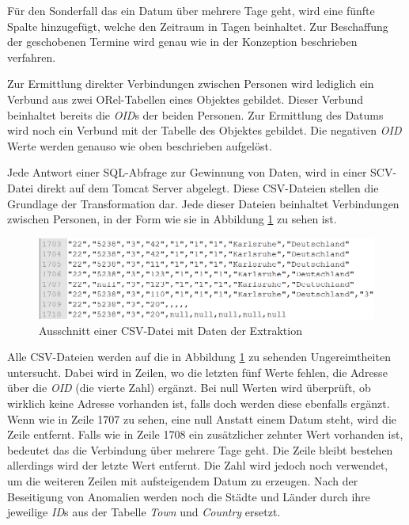 Für den Sonderfall das ein Datum über mehrere Tage geht, wird eine fünfte Spalte hinzugefügt, welche den Zeitraum in Tagen beinhaltet. Zur Beschaffung der geschobenen Termine wird genau wie in der Konzeption beschrieben verfahren.

Zur Ermittlung direkter Verbindungen zwischen Personen wird lediglich ein Verbund aus zwei ORel-Tabellen eines Objektes gebildet. Dieser Verbund beinhaltet bereits die \textit{OID}s der beiden Personen. Zur Ermittlung des Datums wird noch ein Verbund mit der Tabelle des Objektes gebildet. Die negativen \textit{OID} Werte werden genauso wie oben beschrieben aufgelöst. 

Jede Antwort einer SQL-Abfrage zur Gewinnung von Daten, wird in einer SCV-Datei direkt auf dem Tomcat Server abgelegt. Diese CSV-Dateien stellen die Grundlage der Transformation dar. Jede dieser Dateien beinhaltet Verbindungen zwischen Personen, in der Form wie sie in Abbildung \ref{fig:umsetzung_csv_datei} zu sehen ist. 

\begin{figure}[htbp]
\begin{center}
\includegraphics[width=1.0\textwidth]{pics/umsetzung_csv_datei.png}
\caption{Ausschnitt einer CSV-Datei mit Daten der Extraktion}
\label{fig:umsetzung_csv_datei}
\end{center}
\end{figure}

Alle CSV-Dateien werden auf die in Abbildung \ref{fig:umsetzung_csv_datei} zu sehenden Ungereimtheiten untersucht. Dabei wird in Zeilen, wo die letzten fünf Werte fehlen, die Adresse über die \textit{OID} (die vierte Zahl) ergänzt. Bei null Werten wird überprüft, ob wirklich keine Adresse vorhanden ist, falls doch werden diese ebenfalls ergänzt. Wenn wie in Zeile 1707 zu sehen, eine null Anstatt einem Datum steht, wird die Zeile entfernt. Falls wie in Zeile 1708 ein zusätzlicher zehnter Wert vorhanden ist, bedeutet das die Verbindung über mehrere Tage geht. Die Zeile bleibt bestehen allerdings wird der letzte Wert entfernt. Die Zahl wird jedoch noch verwendet, um die weiteren Zeilen mit aufsteigendem Datum zu erzeugen. Nach der Beseitigung von Anomalien werden noch die Städte und Länder durch ihre jeweilige \textit{ID}s aus der Tabelle \textit{Town} und \textit{Country} ersetzt.

